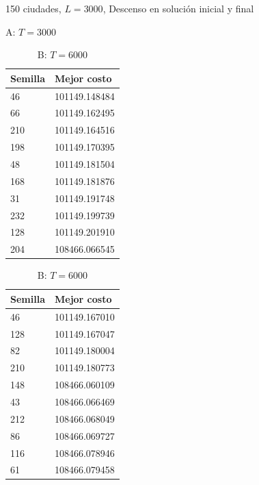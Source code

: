 \documentclass{article}
\begin{document}
  \begin{table}[!htbp]
    \caption{150 ciudades, 
             $L=3000$, 
             Descenso en solución inicial y final}
    \begin{minipage}{.5\linewidth}
      \caption{A: $T= 3000$}
      \centering
      \begin{tabular}{l|l}
        Semilla & Mejor costo \\
        \hline
        46      & 101149.148484 \\
        \hline
        66      & 101149.162495 \\
        \hline
        210     & 101149.164516 \\
        \hline
        198     & 101149.170395 \\
        \hline
        48      & 101149.181504 \\
        \hline
        168     & 101149.181876 \\
        \hline
        31      & 101149.191748 \\
        \hline
        232     & 101149.199739 \\
        \hline
        128     & 101149.201910 \\
        \hline
        204     & 108466.066545 \\
      \end{tabular}
    \end{minipage}%
    \begin{minipage}{.5\linewidth}
      \centering
      \caption{B: $T=6000$}
      \begin{tabular}{l|l}
        Semilla & Mejor costo \\
        \hline
        46      & 101149.167010 \\
        \hline
        128     & 101149.167047 \\
        \hline
        82      & 101149.180004 \\
        \hline
        210     & 101149.180773 \\
        \hline
        148     & 108466.060109 \\
        \hline
        43      & 108466.066469 \\
        \hline
        212     & 108466.068049 \\
        \hline
        86      & 108466.069727 \\
        \hline
        116     & 108466.078946 \\
        \hline
        61      & 108466.079458 \\

\end{tabular}
\end{minipage}
\end{table}
\end{document}
